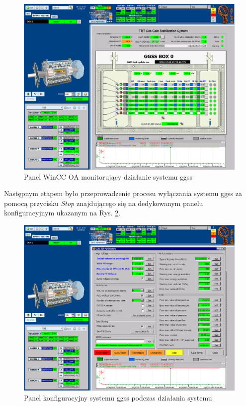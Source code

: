 \begin{figure}[H]
\centering
\caption{Panel WinCC OA monitorujący działanie systemu \gls*{ggss}}
\label{fig:ggss}
\includegraphics[width=\textwidth]{res/png/ggssStraw}
\end{figure}

\newpage
Następnym etapem było przeprowadzenie procesu wyłączania systemu \gls*{ggss} za pomocą przycisku \textit{Stop} znajdującego się na dedykowanym panelu konfiguracyjnym ukazanym na Rys. \ref{fig:ggsspanel}. 

\begin{figure}[H]
\centering
\caption{Panel konfiguracyjny systemu \gls*{ggss} podczas działania systemu}
\label{fig:ggsspanel}
\includegraphics[width=\textwidth]{res/png/ggssConfig}
\end{figure}


